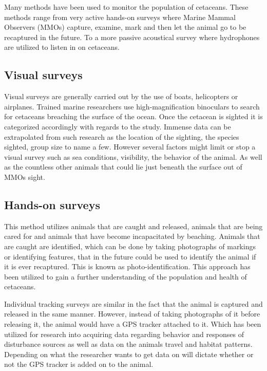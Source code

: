 Many methods have been used to monitor the population of cetaceans.
These methods range from very active hands-on surveys where Marine Mammal Observers (MMOs) capture, examine, mark and then let the animal go to be recaptured in the future.
To a more passive acoustical survey where hydrophones are utilized to listen in on cetaceans.


\subsection{Visual surveys}%

Visual surveys are generally carried out by the use of boats, helicopters or airplanes.
Trained marine researchers use high-magnification  binoculars to search for cetaceans breaching the surface of the ocean.
Once the cetacean is sighted it is categorized accordingly with regards to the study.
Immense data can be extrapolated from such research as the location of the sighting, the species sighted, group size to name a few\cite{campbell_inter-annual_2015}.
However several factors might limit or stop a visual survey such as sea conditions, visibility, the behavior of the animal.
As well as the countless other animals that could lie just beneath the surface out of MMOs sight.

\subsection{Hands-on surveys}

This method utilizes animals that are caught and released, animals that are being cared for and animals that have become incapacitated by beaching. 
Animals that are caught are identified, which can be done by taking photographs of markings or identifying features, that in the future could be used to identify the animal if it is ever recaptured.
This is known as photo-identification\cite{booth_methods_2020}.
This approach has been utilized to gain a further understanding of the population and health of cetaceans.

Individual tracking surveys are similar in the fact that the animal is captured and released in the same manner.
However, instead of taking photographs of it before releasing it, the animal would have a GPS tracker attached to it. 
Which has been utilized for research into acquiring data regarding behavior and responses of disturbance sources as well as data on the animals travel and habitat patterns. 
Depending on what the researcher wants to get data on will dictate whether or not the GPS tracker is added on to the animal\cite{booth_methods_2020}.



